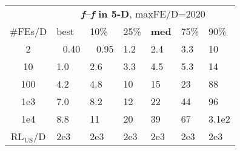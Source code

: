 \begin{tabular}{c|llllll}
 & \multicolumn{6}{|c}{\textbf{\textit{f}\raisebox{-0.35ex}{1}--\textit{f}\raisebox{-0.35ex}{24} in 5-D}, maxFE/D=2020}\\
\#FEs/D & best & 10\% & 25\% & \textbf{med} & 75\% & 90\%\\
2 & ~\,0.40 & ~\,0.95 & \hspace*{1ex}1.2 & \hspace*{1ex}2.4 & \hspace*{1ex}3.3 & 10\\
10 & \hspace*{1ex}1.0 & \hspace*{1ex}2.6 & \hspace*{1ex}3.3 & \hspace*{1ex}4.5 & \hspace*{1ex}5.3 & 14\\
100 & \hspace*{1ex}4.2 & \hspace*{1ex}4.8 & 10 & 15 & 23 & 88\\
1e3 & \hspace*{1ex}7.0 & \hspace*{1ex}8.2 & 12 & 22 & 44 & 96\\
1e4 & \hspace*{1ex}8.8 & 11 & 20 & 39 & 67 & 3.1e2\\
$\text{RL}_{\text{US}}$/D & 2e3 & 2e3 & 2e3 & 2e3 & 2e3 & 2e3
\end{tabular}

